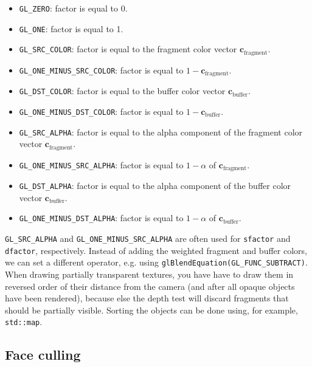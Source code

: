 \documentclass[table, xcdraw]{article}%
\begin{document}
\begin{itemize}
    \item \texttt{GL_ZERO}: factor is equal to 0.
    \item \texttt{GL_ONE}: factor is equal to 1.
    \item \texttt{GL_SRC_COLOR}: factor is equal to the fragment color vector $\bm{c}_\text{fragment}$.
    \item \texttt{GL_ONE_MINUS_SRC_COLOR}: factor is equal to $1 - \bm{c}_\text{fragment}$.
    \item \texttt{GL_DST_COLOR}: factor is equal to the buffer color vector $\bm{c}_\text{buffer}$.
    \item \texttt{GL_ONE_MINUS_DST_COLOR}: factor is equal to $1 - \bm{c}_\text{buffer}$.
    \item \texttt{GL_SRC_ALPHA}: factor is equal to the alpha component of the fragment color vector $\bm{c}_\text{fragment}$.
    \item \texttt{GL_ONE_MINUS_SRC_ALPHA}: factor is equal to $1 - \alpha$ of $\bm{c}_\text{fragment}$.
    \item \texttt{GL_DST_ALPHA}: factor is equal to the alpha component of the buffer color vector $\bm{c}_\text{buffer}$.
    \item \texttt{GL_ONE_MINUS_DST_ALPHA}: factor is equal to $1 - \alpha$ of $\bm{c}_\text{buffer}$.
\end{itemize}

\texttt{GL_SRC_ALPHA} and \texttt{GL_ONE_MINUS_SRC_ALPHA} are often used for \texttt{sfactor} and \texttt{dfactor}, respectively. Instead of adding the weighted fragment and buffer colors, we can set a different operator, e.g. using \texttt{glBlendEquation(GL_FUNC_SUBTRACT)}.\\
When drawing partially transparent textures, you have have to draw them in reversed order of their distance from the camera (and after all opaque objects have been rendered), because else the depth test will discard fragments that should be partially visible. Sorting the objects can be done using, for example, \texttt{std::map}.

\subsection{Face culling}
\end{document}
